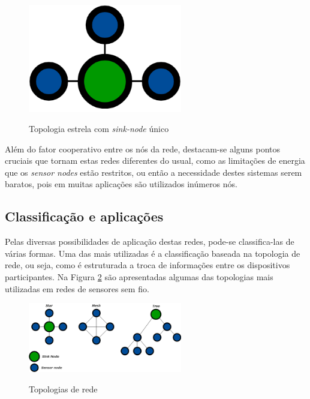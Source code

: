 \documentclass[oneside,openright,12pt]{ufsm_2015} %
\begin{document}
\begin{figure}[ht]
 	    \caption{\label{exepretex} Topologia estrela com \textit{sink-node} único}
    \centering
    \includegraphics[width=0.6\textwidth]{figuras/star_topology.png}
    \vspace{\baselineskip} %
        \label{fig:star-topology}
\end{figure}

Além do fator cooperativo entre os nós da rede, destacam-se alguns pontos cruciais que tornam estas redes diferentes do usual, como as limitações de energia que os \textit{sensor nodes} estão restritos, ou então a necessidade destes sistemas serem baratos, pois em muitas aplicações são utilizados inúmeros nós.

\subsection{Classificação e aplicações}
Pelas diversas possibilidades de aplicação destas redes, pode-se classifica-las de várias formas. Uma das mais utilizadas é a classificação baseada na topologia de rede, ou seja, como é estruturada a troca de informações entre os dispositivos participantes. Na Figura \ref{fig:topologias} são apresentadas algumas das topologias mais utilizadas em redes de sensores sem fio. 

\begin{figure}[ht]
 	    \caption{\label{exepretex} Topologias de rede}
    \centering
    \includegraphics[width=0.6\textwidth]{figuras/toplogias.png}
    \vspace{\baselineskip} %
        \label{fig:topologias}
\end{figure}
\end{document}
